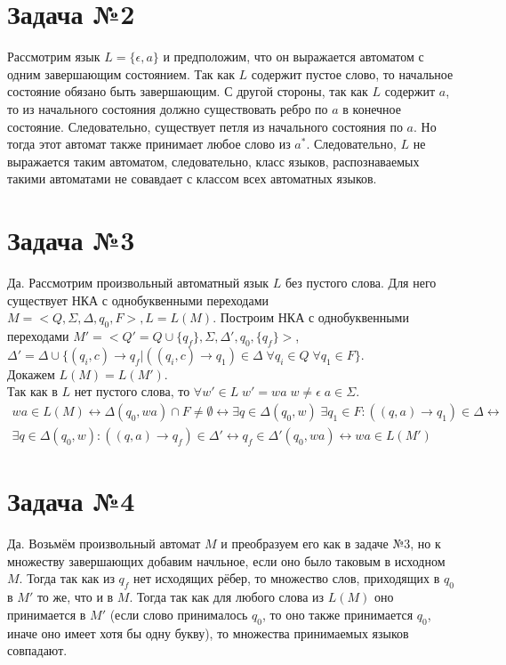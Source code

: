 \documentclass{article}
\begin{document}
    \section{Задача №2}
    Рассмотрим язык $L = \{ \epsilon, a \}$ и предположим, что он выражается автоматом
    с одним завершающим состоянием. Так как $L$ содержит пустое слово, то начальное состояние
    обязано быть завершающим. С другой стороны, так как $L$ содержит $a$, то из начального состояния
    должно существовать ребро по $a$ в конечное состояние. Следовательно, существует петля
    из начального состояния по $a$. Но тогда этот автомат также принимает любое слово из $a^*$.
    Следовательно, $L$ не выражается таким автоматом, следовательно, класс языков, распознаваемых такими
    автоматами не совавдает с классом всех автоматных языков.
    
    \section{Задача №3}
    Да. Рассмотрим произвольный автоматный язык $L$ без пустого слова. Для него существует НКА с
    однобуквенными переходами $M = <Q, \Sigma, \Delta, q_0, F>, L = L(M)$. Построим НКА с
    однобуквенными переходами $M' = <Q' = Q \cup \{ q_f \}, \Sigma, \Delta', q_0, \{ q_f \}> $, 
    $\Delta' = \Delta \cup \{ (q_i, c) \rightarrow q_f |
     ((q_i, c) \rightarrow q_1) \in \Delta \; \forall q_i \in Q \; \forall q_1 \in F \} $. \\
     Докажем $L(M) = L(M')$. \\
     Так как в $L$ нет пустого слова, то $ \forall w' \in L \; w' = wa \; w \neq \epsilon \; a \in \Sigma$.
     \begin{multline}
     wa \in L(M) \leftrightarrow \Delta (q_0, wa) \cap F \neq \emptyset \leftrightarrow 
     \exists q \in \Delta (q_0, w) \; \exists q_1 \in F: ((q, a) \rightarrow q_1) \in \Delta \leftrightarrow \\
     \exists q \in \Delta (q_0, w): ((q, a) \rightarrow q_f) \in \Delta' \leftrightarrow
     q_f \in \Delta'(q_0, wa) \leftrightarrow wa \in L(M')
     \end{multline}
     
     \section{Задача №4}
     Да. Возьмём произвольный автомат $M$ и преобразуем его как в задаче №3, но к множеству завершающих
     добавим начльное, если оно было таковым в исходном $M$. Тогда так как из $q_f$ нет исходящих рёбер,
     то множество слов, приходящих в $q_0$ в $M'$ то же, что и в $M$. Тогда так как для любого слова из $L(M)$ оно
     принимается в $M'$ (если слово принималось $q_0$, то оно также принимается $q_0$, иначе оно имеет хотя бы 
     одну букву), то множества принимаемых языков совпадают.
     
\end{document}
